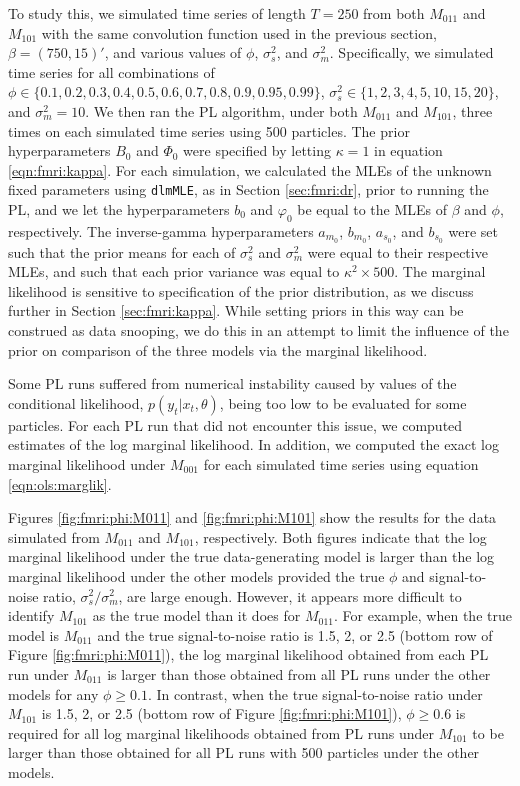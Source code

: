 To study this, we simulated time series of length $T = 250$ from both $M_{011}$ and $M_{101}$ with the same convolution function used in the previous section, $\beta = (750,15)'$, and various values of $\phi$, $\sigma^2_s$, and $\sigma^2_m$. Specifically, we simulated time series for all combinations of $\phi \in \{0.1,0.2,0.3,0.4,0.5,0.6,0.7,0.8,0.9,0.95,0.99\}$, $\sigma^2_s \in \{1,2,3,4,5,10,15,20\}$, and $\sigma^2_m = 10$. We then ran the PL algorithm, under both $M_{011}$ and $M_{101}$, three times on each simulated time series using 500 particles. The prior hyperparameters $B_0$ and $\Phi_0$ were specified by letting $\kappa = 1$ in equation \eqref{eqn:fmri:kappa}. For each simulation, we calculated the MLEs of the unknown fixed parameters using {\tt dlmMLE}, as in Section \ref{sec:fmri:dr}, prior to running the PL, and we let the hyperparameters $b_0$ and $\varphi_0$ be equal to the MLEs of $\beta$ and $\phi$, respectively. The inverse-gamma hyperparameters $a_{m_0}$, $b_{m_0}$, $a_{s_0}$, and $b_{s_0}$ were set such that the prior means for each of $\sigma^2_s$ and $\sigma^2_m$ were equal to their respective MLEs, and such that each prior variance was equal to $\kappa^2\times500$. The marginal likelihood is sensitive to specification of the prior distribution, as we discuss further in Section \ref{sec:fmri:kappa}. While setting priors in this way can be construed as data snooping, we do this in an attempt to limit the influence of the prior on comparison of the three models via the marginal likelihood.

Some PL runs suffered from numerical instability caused by values of the conditional likelihood, $p(y_t|x_t,\theta)$, being too low to be evaluated for some particles. For each PL run that did not encounter this issue, we computed estimates of the log marginal likelihood. In addition, we computed the exact log marginal likelihood under $M_{001}$ for each simulated time series using equation \eqref{eqn:ols:marglik}.

Figures \ref{fig:fmri:phi:M011} and \ref{fig:fmri:phi:M101} show the results for the data simulated from $M_{011}$ and $M_{101}$, respectively. Both figures indicate that the log marginal likelihood under the true data-generating model is larger than the log marginal likelihood under the other models provided the true $\phi$ and signal-to-noise ratio, $\sigma^2_s/\sigma^2_m$, are large enough. However, it appears more difficult to identify $M_{101}$ as the true model than it does for $M_{011}$. For example, when the true model is $M_{011}$ and the true signal-to-noise ratio is 1.5, 2, or 2.5 (bottom row of Figure \ref{fig:fmri:phi:M011}), the log marginal likelihood obtained from each PL run under $M_{011}$ is larger than those obtained from all PL runs under the other models for any $\phi \ge 0.1$. In contrast, when the true signal-to-noise ratio under $M_{101}$ is 1.5, 2, or 2.5 (bottom row of Figure \ref{fig:fmri:phi:M101}), $\phi \ge 0.6$ is required for all log marginal likelihoods obtained from PL runs under $M_{101}$ to be larger than those obtained for all PL runs with 500 particles under the other models.

